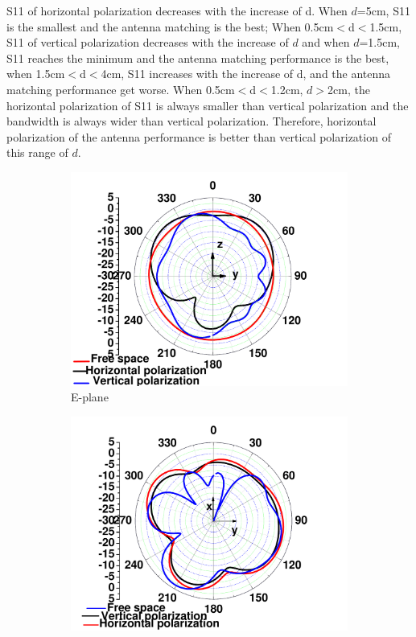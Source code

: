\documentclass[journal]{IEEEtran}
\begin{document}
S11 of horizontal polarization decreases with the increase of d. When $d$=5cm, S11 is the smallest and the antenna
matching is the best; When 0.5cm$<$d$<$1.5cm, S11 of vertical polarization decreases with the increase of
$d$ and when $d$=1.5cm, S11 reaches the minimum and the antenna matching performance is the best, when
1.5cm$<$d$<$4cm, S11 increases with the increase of d, and the antenna matching performance get worse. When
0.5cm$<$d$<$1.2cm, $d$$>$2cm, the horizontal polarization of S11 is always smaller than vertical
polarization and the bandwidth is always wider than vertical polarization. Therefore, horizontal polarization of the antenna
performance is better than vertical polarization of this range of $d$.
\begin{figure}[!htb]
\centering
\begin{subfigure}[b]{0.24\textwidth}
\includegraphics[width=\textwidth]{figs/7a.pdf}
\caption{E-plane}
\label{fig:7a}	
\end{subfigure}
\begin{subfigure}[b]{0.24\textwidth}
\includegraphics[width=\textwidth]{figs/7b.pdf}

\end{subfigure}
\end{figure}$$
\end{document}
